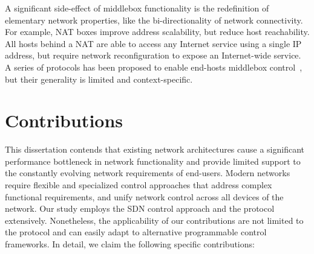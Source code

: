 A significant side-effect of middlebox functionality is the redefinition of
elementary network properties, like the bi-directionality of network
connectivity.  For example, NAT boxes improve address scalability, but reduce
host reachability.  All hosts behind a NAT are able to access any Internet
service using a single IP address, but require network reconfiguration to expose
an Internet-wide service. A series of protocols has been proposed to 
enable end-hosts middlebox control~, but their generality is
limited and context-specific.




\section{Contributions}\label{sec:intro:contributions}

This dissertation contends that existing network architectures cause a
significant performance bottleneck in network functionality and provide limited
support to the constantly evolving network requirements of end-users.  Modern
networks require flexible and specialized control approaches that address
complex functional requirements, and unify network control across all devices
of the network. Our study employs the SDN control approach and the \of protocol
extensively.  Nonetheless, the applicability of our contributions are not
limited to the \of protocol and can easily adapt to alternative programmable
control frameworks. In detail, we claim the following specific contributions:


